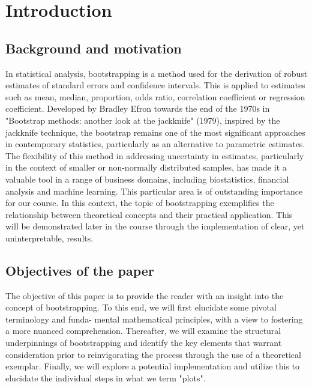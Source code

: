 
\chapter{Introduction} \label{Introduction}


\section{Background and motivation} \label{Background and motivation}
In statistical analysis, bootstrapping is a method used for the derivation of robust estimates of standard errors and confidence intervals. This is applied to estimates such as mean, median, proportion, odds ratio, correlation coefficient or regression coefficient. Developed by Bradley Efron towards the end of the 1970s in "Bootstrap methods: another look at the jackknife" (1979), inspired by the jackknife technique, the bootstrap remains one of the most significant approaches in contemporary statistics, particularly as an alternative to parametric estimates.
The flexibility of this method in addressing uncertainty in estimates, particularly in the context of smaller or non-normally distributed samples, has made it a valuable tool in a range of business domains, including biostatistics, financial analysis and machine learning. This particular area is of outstanding importance for our course.
In this context, the topic of bootstrapping exemplifies the relationship between theoretical concepts and their practical application. This will be demonstrated later in the course through the implementation of clear, yet uninterpretable, results. 


\section{Objectives of the paper}
The objective of this paper is to provide the reader with an insight into the concept of
bootstrapping. To this end, we will first elucidate some pivotal terminology and funda-
mental mathematical principles, with a view to fostering a more nuanced comprehension.
Thereafter, we will examine the structural underpinnings of bootstrapping and identify the
key elements that warrant consideration prior to reinvigorating the process through the use
of a theoretical exemplar. Finally, we will explore a potential implementation and utilize
this to elucidate the individual steps in what we term "plots".



